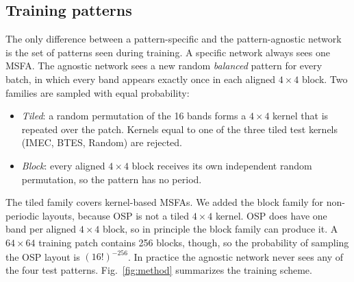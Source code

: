 \documentclass{article}
\begin{document}
\subsection{Training patterns}

The only difference between a pattern-specific and the pattern-agnostic
network is the set of patterns seen during training. A specific network
always sees one MSFA. The agnostic network sees a new random \emph{balanced}
pattern for every batch, in which every band appears exactly once in each
aligned $4\times4$ block. Two families are sampled with equal probability:
\begin{itemize}
  \item \emph{Tiled}: a random permutation of the 16 bands forms a $4\times4$
        kernel that is repeated over the patch. Kernels equal to one of the
        three tiled test kernels (IMEC, BTES, Random) are rejected.
  \item \emph{Block}: every aligned $4\times4$ block receives its own
        independent random permutation, so the pattern has no period.
\end{itemize}
The tiled family covers kernel-based MSFAs. We added the block family for
non-periodic layouts, because OSP is not a tiled $4\times4$ kernel. OSP does
have one band per aligned $4\times4$ block, so in principle the block family
can produce it. A $64\times64$ training patch contains 256 blocks, though,
so the probability of sampling the OSP layout is $(16!)^{-256}$. In practice
the agnostic network never sees any of the four test patterns.
Fig.~\ref{fig:method} summarizes the training scheme.
\end{document}
